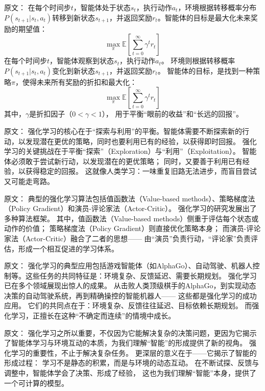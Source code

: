 原文：
在每个时间步$t$，智能体处于状态$s_t$，执行动作$a_t$，环境根据转移概率分布$P(s_{t+1}|s_t, a_t)$转移到新状态$s_{t+1}$，并返回奖励$r_t$。智能体的目标是最大化未来奖励的期望值：
$$
\max_\pi \mathbb{E}\left[\sum_{t=0}^\infty \gamma^t r_t\right]
$$
在每个时间步$t$，智能体观察到状态$s_t$，执行动作$a_t$。  
环境则根据转移概率$P(s_{t+1}|s_t, a_t)$变化到新状态$s_{t+1}$，并返回奖励$r_t$。  
智能体的目标，是找到一种策略$\pi$，使得未来所有奖励的折扣和最大化：
$$
\max_\pi \mathbb{E}\left[\sum_{t=0}^\infty \gamma^t r_t\right]
$$  
其中，$\gamma$是折扣因子（$0 < \gamma < 1$），  
用于平衡“眼前的收益”和“长远的回报”。



原文：
强化学习的核心在于“探索与利用”的平衡。智能体需要不断探索新的行动，以发现潜在更优的策略，同时也要利用已有的经验，以获得即时回报。
强化学习的关键挑战在于平衡“探索”（Exploration）与“利用”（Exploitation）。  
智能体必须敢于尝试新行动，以发现潜在的更优策略；  
同时，又要善于利用已有经验，以获得稳定的回报。  
这就像人类学习：一味重复旧路无法进步，而盲目尝试又可能走弯路。



原文：
典型的强化学习算法包括值函数法（Value-based methods）、策略梯度法（Policy Gradient）和演员-评论家法（Actor-Critic）。
强化学习的研究发展出了多种算法框架。  
其中，值函数法（Value-based methods）侧重于评估每个状态或动作的价值；  
策略梯度法（Policy Gradient）则直接优化策略本身；  
而演员-评论家法（Actor-Critic）融合了二者的思想——  
由“演员”负责行动，“评论家”负责评估，形成一个相互促进的学习体系。



原文：
强化学习的典型应用包括游戏智能体（如AlphaGo）、自动驾驶、机器人控制等。这些任务的共同特征是：环境复杂、反馈延迟、需要长期规划。
强化学习已在多个领域展现出惊人的成果。  
从击败人类顶级棋手的AlphaGo，到实现动态决策的自动驾驶系统，再到精确操控的智能机器人——  
这些都是强化学习的成功应用。  
它们的共同点在于：环境复杂、反馈往往延迟、目标依赖长期规划。  
而强化学习，正擅长在这种“不确定而连续”的情境中成长。



原文：
强化学习之所以重要，不仅因为它能解决复杂的决策问题，更因为它揭示了智能体学习与环境互动的本质，为我们理解“智能”的形成提供了新的视角。
强化学习的重要性，不止于解决复杂任务。  
更深层的意义在于——它揭示了智能的形成过程：  
学习不是静态的积累，而是与环境的动态互动。  
在不断试探、反馈与调整中，智能体学会了决策、形成了经验，  
这也为我们理解“智能”本身，提供了一个可计算的模型。

